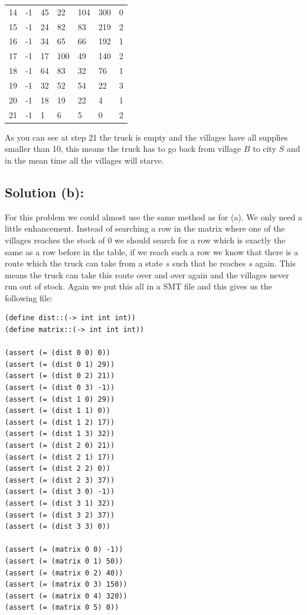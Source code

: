 \documentclass[12pt]{article}
\begin{document}
{\begin{center}
\begin{tabular}{| l | l | l | l | l | l | l |}
14	& 	-1	&	45	&	22 	&	104	&	300	&	0	\\
15	& 	-1	&	24	&	82 	&	83	&	219	&	2	\\
16	& 	-1	&	34	&	65 	&	66	&	192	&	1	\\
17	& 	-1	&	17	&	100 	&	49	&	140	&	2	\\
18	& 	-1	&	64	&	83 	&	32	&	76	&	1	\\
19	& 	-1	&	32	&	52 	&	54	&	22	&	3	\\
20	& 	-1	&	18	&	19 	&	22	&	4	&	1	\\
21	& 	-1	&	1	&	6	&	5	&	0	&	2	\\
\hline
\end{tabular}
\end{center}
\vspace{3mm}

\noindent As you can see at step 21 the truck is empty and the villages have all supplies smaller than 10, this means the truck has to go back from village $B$ to city $S$ and in the mean time all the villages will starve.
\vspace{3mm}

\subsection*{Solution (b):}
For this problem we could almost use the same method as for (a). We only need a little enhancement. Instead of searching a row in the matrix where one of the villages reaches the stock of 0 we should search for a row which is exactly the same as a row before in the table, if we reach such a row we know that there is a route which the truck can take from a state $s$ such that he reaches $s$ again. This means the truck can take this route over and over again and the villages never run out of stock. Again we put this all in a SMT file and this gives us the following file:

{\footnotesize
\begin{verbatim}
(define dist::(-> int int int))
(define matrix::(-> int int int))

(assert (= (dist 0 0) 0))
(assert (= (dist 0 1) 29))
(assert (= (dist 0 2) 21))
(assert (= (dist 0 3) -1))
(assert (= (dist 1 0) 29))
(assert (= (dist 1 1) 0))
(assert (= (dist 1 2) 17))
(assert (= (dist 1 3) 32))
(assert (= (dist 2 0) 21))
(assert (= (dist 2 1) 17))
(assert (= (dist 2 2) 0))
(assert (= (dist 2 3) 37))
(assert (= (dist 3 0) -1))
(assert (= (dist 3 1) 32))
(assert (= (dist 3 2) 37))
(assert (= (dist 3 3) 0))

(assert (= (matrix 0 0) -1))
(assert (= (matrix 0 1) 50))
(assert (= (matrix 0 2) 40))
(assert (= (matrix 0 3) 150))
(assert (= (matrix 0 4) 320))
(assert (= (matrix 0 5) 0))


\end{verbatim}}}
\end{document}
